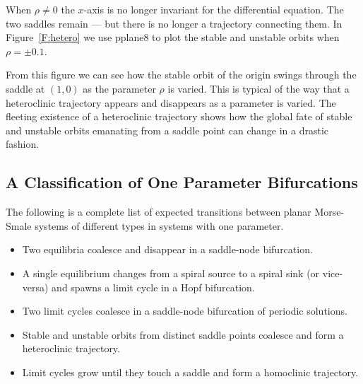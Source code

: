 \documentclass{ximera}
\begin{document}
When $\rho\neq 0$ the $x$-axis is no longer invariant for the differential 
equation.  The two saddles remain --- but there is no longer a 
trajectory connecting them.  In Figure~\ref{F:hetero} we use 
{\sf pplane8} 
to plot the stable and unstable orbits when $\rho=\pm 0.1$.

From this figure we can see how the stable orbit of the origin swings 
through the saddle at $(1,0)$ as the parameter $\rho$ is varied.  This
is typical of the way that a heteroclinic trajectory appears and disappears 
as a parameter is varied.  The fleeting existence of a heteroclinic trajectory
shows how the global fate of stable and unstable orbits emanating from a 
saddle point can change in a drastic fashion. 


\subsection*{A Classification of One Parameter Bifurcations}

The following is a complete list of expected transitions between planar 
Morse-Smale systems of different types in systems with one parameter.
\begin{itemize}
\item	Two equilibria coalesce and disappear in a saddle-node bifurcation.
\item	A single equilibrium changes from a spiral source to a spiral sink (or 
vice-versa) and spawns a limit cycle in a Hopf bifurcation.
\item	Two limit cycles coalesce in a saddle-node bifurcation of 
periodic solutions.
\item	Stable and unstable orbits from distinct saddle points
coalesce and form a heteroclinic trajectory.
\item	Limit cycles grow until they touch a saddle and form a homoclinic 
trajectory.
\end{itemize}


\EXER

\CEXER
\end{document}
